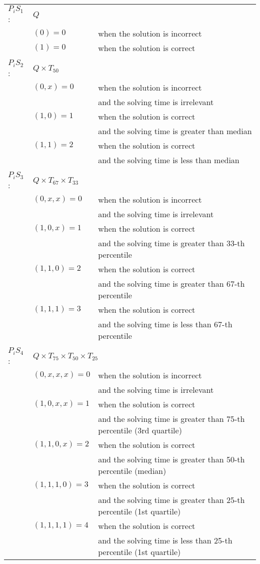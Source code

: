 \begin{center}\scriptsize
\begin{tabular}{lll}
$P_{i}S_{1}$:&\multicolumn{2}{l}{$Q$}   \\
& $(0) = 0$ &  when the solution is incorrect \\
& $(1) = 0$ &  when the solution is correct \\
& & \\
$P_{i}S_{2}$:&\multicolumn{2}{l}{$Q{\times}T_{50}$} \\
& $(0,x) = 0$ & when the solution is incorrect\\
&  & and the solving time is irrelevant\\
& $(1,0) = 1$ & when the solution is correct\\
& & and the solving time is greater than median\\
& $(1,1) = 2$ & when the solution is correct\\
& & and the solving time is less than median\\
& & \\
$P_{i}S_{3}$:&\multicolumn{2}{l}{$Q{\times}T_{67}{\times}T_{33}$} \\
& $(0,x,x) = 0$ & when the solution is incorrect\\
&  & and the solving time is irrelevant\\
& $(1,0,x) = 1$ & when the solution is correct\\
& & and the solving time is greater than 33-th percentile\\
& $(1,1,0) = 2$ & when the solution is correct\\
& & and the solving time is greater than 67-th percentile\\
& $(1,1,1) = 3$ & when the solution is correct\\
&  & and the solving time is less than 67-th percentile\\
& & \\
$P_{i}S_{4}$:&\multicolumn{2}{l}{$Q{\times}T_{75}{\times}T_{50}{\times}T_{25}$} \\
& $(0,x,x,x) = 0$ & when the solution is incorrect\\
&  & and the solving time is irrelevant\\
& $(1,0,x,x) = 1$ & when the solution is correct\\
& & and the solving time is greater than 75-th percentile (3rd quartile)\\
& $(1,1,0,x) = 2$ & when the solution is correct\\
& & and the solving time is greater than 50-th percentile (median)\\
& $(1,1,1,0) = 3$ & when the solution is correct\\
&  & and the solving time is greater than 25-th percentile (1st quartile)\\
& $(1,1,1,1) = 4$ & when the solution is correct\\
&  & and the solving time is less than 25-th percentile (1st quartile)\\
\end{tabular}
\end{center}

